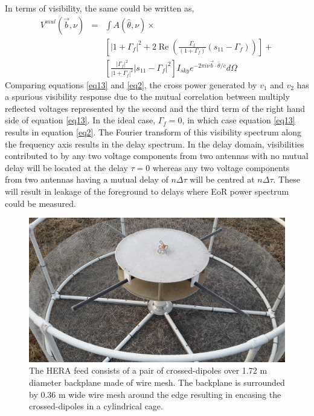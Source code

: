 \documentclass[twocolumn]{emulateapj}
\newcommand{\vis}{{V}}
\newcommand{\beam}{{A}}
\newcommand{\thhat}{{\hat\theta}}
\newcommand{\ifngexp}{{e^{-2\pi i\nu\vec{b}\cdot\thhat/c}}}
\begin{document}
    In terms of visibility, the same could be written as,  
    \begin{eqnarray}
    \vis^{mul}(\vec b,\nu) & = & \int \beam(\thhat,\nu)\times \nonumber\\
                 && \left[|1+\Gamma_f|^2 +  2\operatorname{Re}\left(\frac{\Gamma_f}{(1+\Gamma_f)}(s_{11} - \Gamma_f)\right)\right] + \nonumber\\ 
                 &&  \left[ \frac{|\Gamma_f|^2}{|1+\Gamma_{f}|^2}|s_{11} - \Gamma_f|^2  \right]  I_{sky} \ifngexp d\Omega
    \label{eq13}
    \end{eqnarray}
    Comparing equations \ref{eq13} and \ref{eq2}, the cross power generated by
    $v_{1}$ and $v_{2}$ has a spurious visibility response due to the mutual
    correlation between multiply reflected voltages represented by the second and
    the third term of the right hand side of equation \ref{eq13}. In the ideal
    case, $\Gamma_{f}=0$, in which case equation \ref{eq13} results in equation
    \ref{eq2}. The Fourier transform of this visibility spectrum along the
    frequency axis results in the delay spectrum.  In the delay domain,
    visibilities contributed to by any two voltage components from two antennas
    with no mutual delay will be located at the delay $\tau = 0$ whereas any two
    voltage components from two antennas having a mutual delay of $n\Delta \tau$
    will be centred at $n\Delta \tau$. These will result in leakage of the foreground 
    to delays where EoR power spectrum could be measured.
     \begin{figure}
    \centering
    \includegraphics[trim={2cm 10cm 20cm 5cm},clip, totalheight=0.3\textheight]{plots/herafeed.jpg}
    \vspace{1.0 em}
    \caption{The HERA feed consists of a pair of crossed-dipoles over 1.72 m diameter backplane made of wire mesh. The backplane is surrounded by 0.36 m wide wire mesh around the edge resulting in encasing the crossed-dipoles in a cylindrical cage.}
    \label{fig:herafeed}
    \end{figure}
\end{document}
